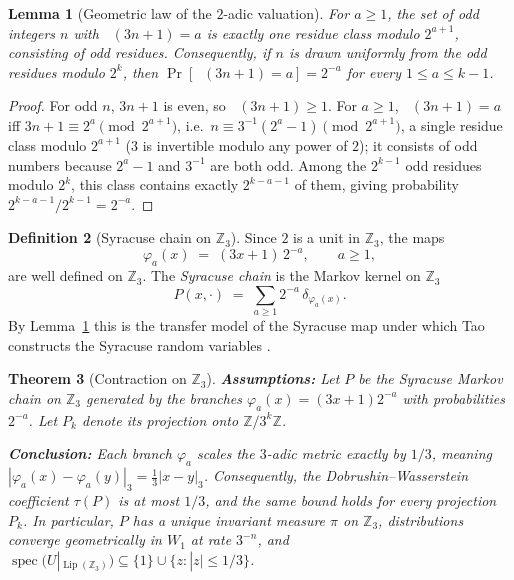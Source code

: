 \documentclass[11pt]{amsart}
\newtheorem{theorem}{Theorem}[section]
\newtheorem{lemma}[theorem]{Lemma}
\theoremstyle{definition}
\newtheorem{definition}[theorem]{Definition}
\theoremstyle{remark}
\newcommand{\Z}{\mathbb{Z}}
\newcommand{\Zthree}{\Z_3}
\newcommand{\Lip}{\operatorname{Lip}}
\newcommand{\dW}{W_1}
\DeclareMathOperator{\nutwo}{\nu_2}
\begin{document}
\begin{lemma}[Geometric law of the $2$-adic valuation]\label{lem:geometric}
For $a \ge 1$, the set of odd integers $n$ with $\nutwo(3n+1) = a$ is exactly one residue class modulo $2^{a+1}$, consisting of odd residues. Consequently, if $n$ is drawn uniformly from the odd residues modulo $2^k$, then $\Pr[\nutwo(3n+1) = a] = 2^{-a}$ for every $1 \le a \le k-1$.
\end{lemma}

\begin{proof}
For odd $n$, $3n+1$ is even, so $\nutwo(3n+1) \ge 1$. For $a \ge 1$, $\nutwo(3n+1) = a$ iff $3n+1 \equiv 2^a \pmod{2^{a+1}}$, i.e.\ $n \equiv 3^{-1}(2^a - 1) \pmod{2^{a+1}}$, a single residue class modulo $2^{a+1}$ ($3$ is invertible modulo any power of $2$); it consists of odd numbers because $2^a - 1$ and $3^{-1}$ are both odd. Among the $2^{k-1}$ odd residues modulo $2^k$, this class contains exactly $2^{k-a-1}$ of them, giving probability $2^{k-a-1}/2^{k-1} = 2^{-a}$.
\end{proof}

\begin{definition}[Syracuse chain on $\Zthree$]\label{def:syracusechain}
Since $2$ is a unit in $\Zthree$, the maps
\[
\varphi_a(x) \;=\; (3x+1)\,2^{-a}, \qquad a \ge 1,
\]
are well defined on $\Zthree$. The \emph{Syracuse chain} is the Markov kernel on $\Zthree$
\[
P(x,\cdot) \;=\; \sum_{a \ge 1} 2^{-a}\, \delta_{\varphi_a(x)} .
\]
By Lemma~\ref{lem:geometric} this is the transfer model of the Syracuse map under which Tao constructs the Syracuse random variables \cite{tao2022}.
\end{definition}

\begin{theorem}[Contraction on $\Zthree$]\label{thm:z3}
\textbf{Assumptions:} Let $P$ be the Syracuse Markov chain on $\Zthree$ generated by the branches $\varphi_a(x) = (3x+1)2^{-a}$ with probabilities $2^{-a}$. Let $P_k$ denote its projection onto $\Z/3^k\Z$.

\textbf{Conclusion:} Each branch $\varphi_a$ scales the $3$-adic metric exactly by $1/3$, meaning $|\varphi_a(x) - \varphi_a(y)|_3 = \tfrac13|x-y|_3$. Consequently, the Dobrushin--Wasserstein coefficient $\tau(P)$ is at most $1/3$, and the same bound holds for every projection $P_k$. In particular, $P$ has a unique invariant measure $\pi$ on $\Zthree$, distributions converge geometrically in $\dW$ at rate $3^{-n}$, and $\operatorname{spec}(U|_{\Lip(\Zthree)}) \subseteq \{1\} \cup \{z : |z| \le 1/3\}$.
\end{theorem}
\end{document}
